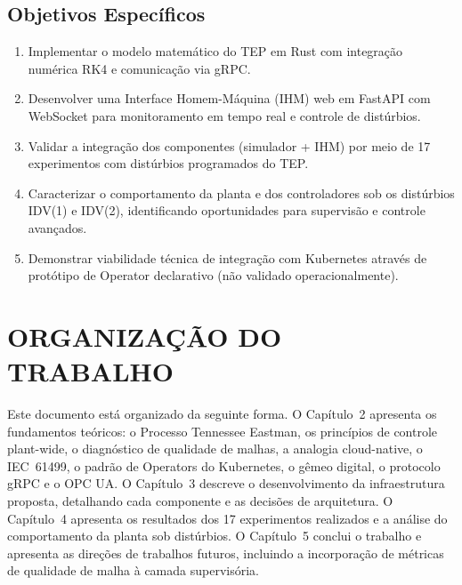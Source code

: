 \subsection{Objetivos Específicos}
\begin{enumerate}
    \item Implementar o modelo matemático do TEP em Rust com integração numérica RK4 e comunicação via gRPC.
    \item Desenvolver uma Interface Homem-Máquina (IHM) web em FastAPI com WebSocket para monitoramento em tempo real e controle de distúrbios.
    \item Validar a integração dos componentes (simulador + IHM) por meio de 17 experimentos com distúrbios programados do TEP.
    \item Caracterizar o comportamento da planta e dos controladores sob os distúrbios IDV(1) e IDV(2), identificando oportunidades para supervisão e controle avançados.
    \item Demonstrar viabilidade técnica de integração com Kubernetes através de protótipo de Operator declarativo (não validado operacionalmente).
\end{enumerate}

\section{ORGANIZAÇÃO DO TRABALHO}

Este documento está organizado da seguinte forma. O Capítulo~2 apresenta os fundamentos teóricos: o Processo Tennessee Eastman, os princípios de controle plant-wide, o diagnóstico de qualidade de malhas, a analogia cloud-native, o IEC~61499, o padrão de Operators do Kubernetes, o gêmeo digital, o protocolo gRPC e o OPC UA. O Capítulo~3 descreve o desenvolvimento da infraestrutura proposta, detalhando cada componente e as decisões de arquitetura. O Capítulo~4 apresenta os resultados dos 17 experimentos realizados e a análise do comportamento da planta sob distúrbios. O Capítulo~5 conclui o trabalho e apresenta as direções de trabalhos futuros, incluindo a incorporação de métricas de qualidade de malha à camada supervisória.
